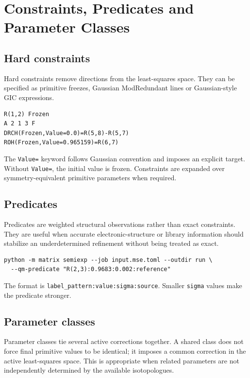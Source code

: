 \documentclass[11pt]{article}
\begin{document}
\section{Constraints, Predicates and Parameter Classes}

\subsection{Hard constraints}

Hard constraints remove directions from the least-squares space.  They can be
specified as primitive freezes, Gaussian ModRedundant lines or Gaussian-style
GIC expressions.

\begin{lstlisting}[style=oracle]
R(1,2) Frozen
A 2 1 3 F
DRCH(Frozen,Value=0.0)=R(5,8)-R(5,7)
ROH(Frozen,Value=0.965159)=R(6,7)
\end{lstlisting}

\noindent
The \texttt{Value=} keyword follows Gaussian convention and imposes an explicit
target.  Without \texttt{Value=}, the initial value is frozen.  Constraints are
expanded over symmetry-equivalent primitive parameters when required.

\subsection{Predicates}

Predicates are weighted structural observations rather than exact constraints.
They are useful when accurate electronic-structure or library information
should stabilize an underdetermined refinement without being treated as exact.

\begin{lstlisting}[style=oracle]
python -m matrix semiexp --job input.mse.toml --outdir run \
  --qm-predicate "R(2,3):0.9683:0.002:reference"
\end{lstlisting}

\noindent
The format is \texttt{label\_pattern:value:sigma:source}.  Smaller
\texttt{sigma} values make the predicate stronger.

\subsection{Parameter classes}

Parameter classes tie several active corrections together.  A shared class
does not force final primitive values to be identical; it imposes a common
correction in the active least-squares space.  This is appropriate when
related parameters are not independently determined by the available
isotopologues.
\end{document}
